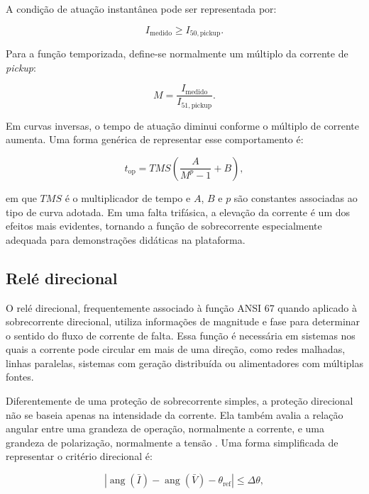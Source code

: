 A condição de atuação instantânea pode ser representada por:

\begin{equation}
  I_{\text{medido}} \geq I_{50,\text{pickup}}.
  \label{eq:sobrecorrente-50}
\end{equation}

Para a função temporizada, define-se normalmente um múltiplo da corrente de \textit{pickup}:

\begin{equation}
  M = \frac{I_{\text{medido}}}{I_{51,\text{pickup}}}.
  \label{eq:multiplo-corrente}
\end{equation}

\noindent Em curvas inversas, o tempo de atuação diminui conforme o múltiplo de corrente aumenta. Uma forma genérica de representar esse comportamento é:

\begin{equation}
  t_{\text{op}} = TMS \left(\frac{A}{M^p - 1} + B \right),
  \label{eq:curva-inversa}
\end{equation}

\noindent em que $TMS$ é o multiplicador de tempo e $A$, $B$ e $p$ são constantes associadas ao tipo de curva adotada. Em uma falta trifásica, a elevação da corrente é um dos efeitos mais evidentes, tornando a função de sobrecorrente especialmente adequada para demonstrações didáticas na plataforma.

\subsection{Relé direcional}

O relé direcional, frequentemente associado à função ANSI 67 quando aplicado à sobrecorrente direcional, utiliza informações de magnitude e fase para determinar o sentido do fluxo de corrente de falta. Essa função é necessária em sistemas nos quais a corrente pode circular em mais de uma direção, como redes malhadas, linhas paralelas, sistemas com geração distribuída ou alimentadores com múltiplas fontes.

Diferentemente de uma proteção de sobrecorrente simples, a proteção direcional não se baseia apenas na intensidade da corrente. Ela também avalia a relação angular entre uma grandeza de operação, normalmente a corrente, e uma grandeza de polarização, normalmente a tensão \cite{horowitz2014power,blackburn2006protective}. Uma forma simplificada de representar o critério direcional é:

\begin{equation}
  \left|\operatorname{ang}(\bar{I}) - \operatorname{ang}(\bar{V}) - \theta_{\text{ref}}\right| \leq \Delta\theta,
  \label{eq:criterio-direcional}
\end{equation}


